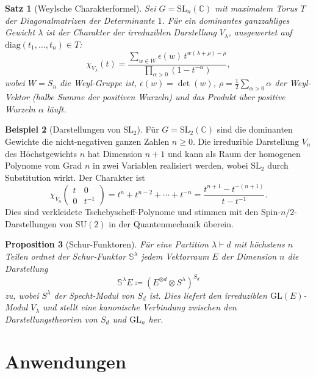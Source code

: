 \documentclass[12pt,a4paper]{amsart}
\newtheorem{theorem}{Satz}[section]
\newtheorem{proposition}[theorem]{Proposition}
\theoremstyle{definition}
\newtheorem{beispiel}[theorem]{Beispiel}
\begin{document}
\begin{theorem}[Weylsche Charakterformel]
\label{satz:weyl_charformel}
Sei $G = \mathrm{SL}_n(\mathbb{C})$ mit maximalem Torus $T$ der
Diagonalmatrizen der Determinante $1$.  Für ein dominantes ganzzahliges Gewicht
$\lambda$ ist der Charakter der irreduziblen Darstellung $V_\lambda$, ausgewertet
auf $\mathrm{diag}(t_1,\ldots,t_n) \in T$:
\[
    \chi_{V_\lambda}(t) = \frac{\sum_{w \in W} \epsilon(w)\, t^{w(\lambda+\rho)-\rho}}{\prod_{\alpha > 0}(1 - t^{-\alpha})},
\]
wobei $W = S_n$ die Weyl-Gruppe ist, $\epsilon(w) = \det(w)$, $\rho =
\tfrac{1}{2}\sum_{\alpha > 0}\alpha$ der Weyl-Vektor (halbe Summe der positiven
Wurzeln) und das Produkt über positive Wurzeln $\alpha$ läuft.
\end{theorem}

\begin{beispiel}[Darstellungen von $\mathrm{SL}_2$]
Für $G = \mathrm{SL}_2(\mathbb{C})$ sind die dominanten Gewichte die
nicht-negativen ganzen Zahlen $n \geq 0$.  Die irreduzible Darstellung $V_n$
des Höchstgewichts $n$ hat Dimension $n+1$ und kann als Raum der homogenen
Polynome vom Grad $n$ in zwei Variablen realisiert werden, wobei $\mathrm{SL}_2$
durch Substitution wirkt.  Der Charakter ist
\[
    \chi_{V_n}\!\left(\begin{smallmatrix}t & 0 \\ 0 & t^{-1}\end{smallmatrix}\right)
    = t^n + t^{n-2} + \cdots + t^{-n} = \frac{t^{n+1} - t^{-(n+1)}}{t - t^{-1}}.
\]
Dies sind verkleidete Tschebyscheff-Polynome und stimmen mit den Spin-$n/2$-Dar\-stel\-lun\-gen
von $\mathrm{SU}(2)$ in der Quantenmechanik überein.
\end{beispiel}

\begin{proposition}[Schur-Funktoren]
Für eine Partition $\lambda \vdash d$ mit höchstens $n$ Teilen ordnet der
\emph{Schur-Funktor} $\mathbb{S}^\lambda$ jedem Vektorraum $E$ der Dimension $n$
die Darstellung
\[
    \mathbb{S}^\lambda E \coloneqq (E^{\otimes d} \otimes S^\lambda)^{S_d}
\]
zu, wobei $S^\lambda$ der Specht-Modul von $S_d$ ist.  Dies liefert den
irreduziblen $\mathrm{GL}(E)$-Modul $V_\lambda$ und stellt eine kanonische
Verbindung zwischen den Darstellungstheorien von $S_d$ und $\mathrm{GL}_n$ her.
\end{proposition}

\section{Anwendungen}
\label{sec:anwendungen}
\end{document}
